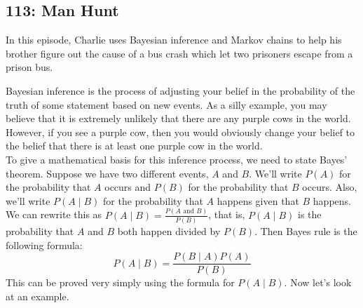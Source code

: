 \newpage
\subsection{113: Man Hunt\label{113}}

In this episode, Charlie uses Bayesian inference and Markov chains to help his brother figure out the cause of a bus crash which let two prisoners escape from a prison bus. \\


Bayesian inference is the process of adjusting your belief in the probability of the truth of some statement based on new events. As a silly example, you may believe that it is extremely unlikely that there are any purple cows in the world. However, if you see a purple cow, then you would obviously change your belief to the belief that there is at least one purple cow in the world. \\

To give a mathematical basis for this inference process, we need to state Bayes' theorem. Suppose we have two different events, $A$ and $B$. We'll write $P(A)$ for the probability that $A$ occurs and $P(B)$ for the probability that $B$ occurs. Also, we'll write $P(A\mid B)$ for the probability that $A$ happens given that $B$ happens. We can rewrite this as $P(A\mid B)=\frac{P(A \text{ and }B)}{P(B)}$, that is, $P(A\mid B)$ is the probability that $A$ and $B$ both happen divided by $P(B)$. Then Bayes rule is the following formula: \\
	\[
	P(A \mid B) = \frac{P(B \mid A) P(A)}{P(B)}
	\]
This can be proved very simply using the formula for $P(A\mid B)$. Now let's look at an example. \\

